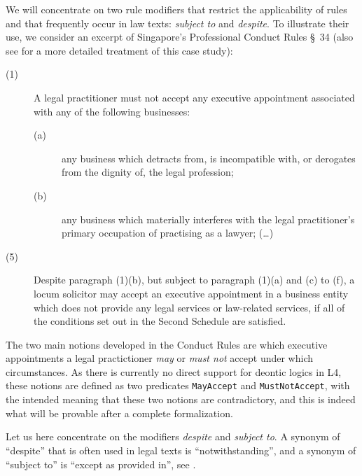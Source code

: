 We will concentrate on two rule modifiers that restrict the applicability of
rules and that frequently occur in law texts: \emph{subject to} and
\emph{despite}. To illustrate their use, we consider an excerpt of Singapore's
Professional Conduct Rules \S~34 \cite{professional_conduct_rules} (also see
\cite{morris21:_const_answer_set_progr_tool} for a more detailed treatment of
this case study):

\begin{description}
\item[(1)] A legal practitioner must not accept any executive appointment associated with any of the following businesses:
  \begin{description}
  \item[(a)] any business which detracts from, is incompatible with, or
    derogates from the dignity of, the legal profession;
  \item[(b)] any business which materially interferes with the legal
    practitioner’s primary occupation of practising as a lawyer; (\dots)
  \end{description}
\item[(5)] Despite paragraph (1)(b), but subject to paragraph (1)(a) and (c)
  to (f), a locum solicitor may accept an executive appointment in a business
  entity which does not provide any legal services or law-related services, if
  all of the conditions set out in the Second Schedule are satisfied.
\end{description}

The two main notions developed in the Conduct Rules are which executive appointments a legal
practictioner \emph{may} or \emph{must not} accept under which
circumstances. As there is currently no direct support for deontic logics in
L4, these notions are defined as two predicates \texttt{MayAccept} and
\texttt{MustNotAccept}, with the intended meaning that these two notions are
contradictory, and this is indeed what will be provable after a complete
formalization.

Let us here concentrate on the modifiers \emph{despite} and \emph{subject
  to}. A synonym of ``despite'' that is often used in legal texts is
``notwithstanding'',  and a synonym of
``subject to'' is ``except as provided in'', see \cite{adams_contract_drafting_2004}.


